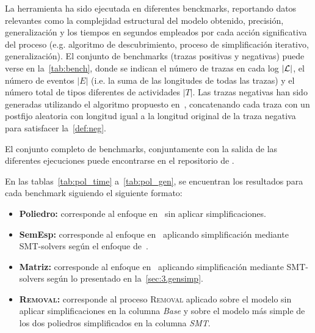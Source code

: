 La herramienta ha sido ejecutada en diferentes benckmarks, reportando datos relevantes como la 
complejidad estructural del modelo obtenido, precisión, generalización y los tiempos en segundos 
empleados por cada acción significativa del proceso (e.g. algoritmo de descubrimiento,
proceso de simplificación iterativo, generalización).
El conjunto de benchmarks (trazas positivas y negativas) puede verse en la~\autoref{tab:bench}, donde se
indican el número de trazas en cada log $|{\mathcal L}|$, el número de eventos $|E|$ (i.e. la suma de las 
longitudes de todas las trazas) y el número total de tipos diferentes de actividades $|T|$.
Las trazas negativas han sido generadas utilizando el algoritmo propuesto en~\cite{BrouckeWVB14},
concatenando cada traza con un postfijo aleatoria con longitud igual a la longitud original de la traza
negativa para satisfacer la~\autoref{def:neg}.

El conjunto completo de benchmarks, conjuntamente con la salida de las diferentes ejecuciones puede 
encontrarse en el repositorio de \pachtool.

En las tablas~\ref{tab:pol_time} a~\ref{tab:pol_gen}, se encuentran los resultados para cada benchmark siguiendo
el siguiente formato:

\begin{itemize}
    \item \textbf{Poliedro:} corresponde al enfoque en~\cite{CarmonaC14} sin aplicar simplificaciones.
    \item \textbf{SemEsp:} corresponde al enfoque en~\cite{CarmonaC14} aplicando simplificación mediante SMT-solvers según el enfoque de~\cite{LeonCB15}.
    \item \textbf{Matriz:} corresponde al enfoque en~\cite{CarmonaC14} aplicando simplificación mediante SMT-solvers según lo 
      presentado en la~\autoref{sec:3.gensimp}.
  \item \textbf{\textsc{Removal}:} corresponde al proceso \textsc{Removal} aplicado sobre el modelo
      sin aplicar simplificaciones en la columna \textit{Base} y sobre el modelo más simple de los
      dos poliedros simplificados en la columna \textit{SMT}.
\end{itemize}


